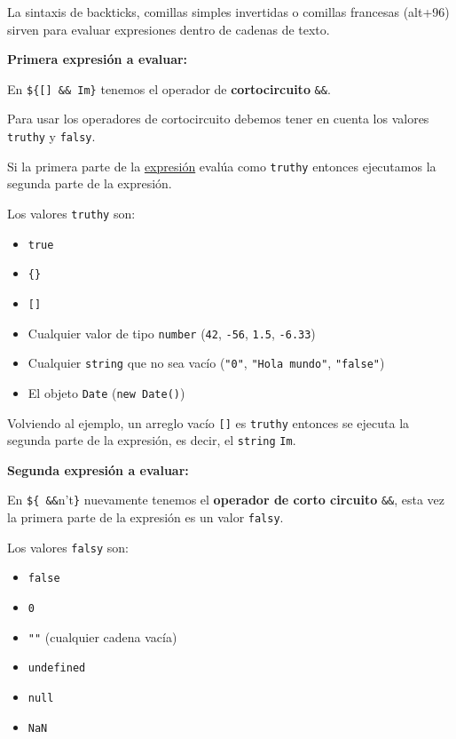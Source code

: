 \documentclass[
  letterpaper,
  DIV=11,
  numbers=noendperiod]{scrreprt}
\providecommand{\tightlist}{%
  \setlength{\itemsep}{0pt}\setlength{\parskip}{0pt}}
\begin{document}
La sintaxis de backticks, comillas simples invertidas o comillas
francesas (alt+96) sirven para evaluar expresiones dentro de cadenas de
texto.

\textbf{Primera expresión a evaluar:}

En \texttt{\$\{{[}{]}\ \&\&\ \textquotesingle{}Im\textquotesingle{}\}}
tenemos el operador de \textbf{cortocircuito} \texttt{\&\&}.

Para usar los operadores de cortocircuito debemos tener en cuenta los
valores \texttt{truthy} y \texttt{falsy}.

Si la primera parte de la \hyperref[glos-expresion]{expresión} evalúa
como \texttt{truthy} entonces ejecutamos la segunda parte de la
expresión.

Los valores \texttt{truthy} son:

\begin{itemize}
\tightlist
\item
  \texttt{true}
\item
  \texttt{\{\}}
\item
  \texttt{{[}{]}}
\item
  Cualquier valor de tipo \texttt{number} (\texttt{42}, \texttt{-56},
  \texttt{1.5}, \texttt{-6.33})
\item
  Cualquier \texttt{string} que no sea vacío (\texttt{"0"},
  \texttt{"Hola\ mundo"}, \texttt{"false"})
\item
  El objeto \texttt{Date} (\texttt{new\ Date()})
\end{itemize}

Volviendo al ejemplo, un arreglo vacío \texttt{{[}{]}} es
\texttt{truthy} entonces se ejecuta la segunda parte de la expresión, es
decir, el \texttt{string}
\texttt{\textquotesingle{}Im\textquotesingle{}}.

\textbf{Segunda expresión a evaluar:}

En \texttt{\$\{\textquotesingle{}\textquotesingle{}\ \&\&}n't\texttt{\}}
nuevamente tenemos el \textbf{operador de corto circuito} \texttt{\&\&},
esta vez la primera parte de la expresión es un valor \texttt{falsy}.

Los valores \texttt{falsy} son:

\begin{itemize}
\tightlist
\item
  \texttt{false}
\item
  \texttt{0}
\item
  \texttt{""} (cualquier cadena vacía)
\item
  \texttt{undefined}
\item
  \texttt{null}
\item
  \texttt{NaN}
\end{itemize}
\end{document}
